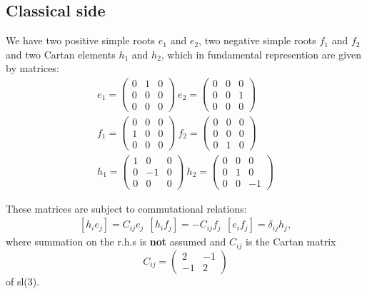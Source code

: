 \documentclass{paper}
\def\be{\begin{eqnarray}}
\def\ee{\end{eqnarray}}
\def\lb{\left (}
\def\rb{\right )}
\def\lsb{\left [}
\def\rsb{\right ]}
\begin{document}
\subsection{Classical side}
We have two positive simple roots $e_1$ and $e_2$, two negative simple roots $f_1$ and $f_2$ and
two Cartan elements $h_1$ and $h_2$, which in fundamental represention are given by matrices:
\be
e_1 = \lb \begin{array}{ccc}
  0 & 1 & 0 \\
  0 & 0 & 0 \\
  0 & 0 & 0
\end{array}\rb
\
e_2 = \lb \begin{array}{ccc}
  0 & 0 & 0 \\
  0 & 0 & 1 \\
  0 & 0 & 0
\end{array}\rb \nonumber
\\
f_1 = \lb \begin{array}{ccc}
  0 & 0 & 0 \\
  1 & 0 & 0 \\
  0 & 0 & 0
\end{array}\rb
\
f_2 = \lb \begin{array}{ccc}
  0 & 0 & 0 \\
  0 & 0 & 0 \\
  0 & 1 & 0
\end{array}\rb \nonumber
\\
h_1 = \lb \begin{array}{ccc}
  1 & 0 & 0 \\
  0 & -1 & 0 \\
  0 & 0 & 0
\end{array}\rb
\
h_2 = \lb \begin{array}{ccc}
  0 & 0 & 0 \\
  0 & 1 & 0 \\
  0 & 0 & -1
\end{array}\rb \nonumber
\ee

These matrices are subject to commutational relations:
\be
\lsb h_i e_j \rsb = C_{ij} e_j\ \
\lsb h_i f_j \rsb = -C_{ij} f_j\ \
\lsb e_i f_j \rsb = \delta_{ij} h_j \nonumber,
\ee
where summation on the r.h.s is {\bf not} assumed and $C_{ij}$ is the Cartan matrix
$$
C_{ij} = \lb \begin{array}{cc}
  2 & -1 \\
  -1 & 2
\end{array}\rb
$$
of sl(3).
\end{document}
